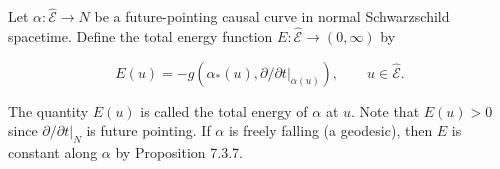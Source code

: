 Let $\alpha: \hat{\mathcal{E}} \rightarrow N$ be a future-pointing causal curve in normal Schwarzschild spacetime. Define the total energy function $E: \hat{\mathcal{E}} \rightarrow (0, \infty)$ by

$$E(u) = -g(\alpha_*(u), \partial/\partial t|_{\alpha(u)}), \qquad u \in \hat{\mathcal{E}}.$$

The quantity $E(u)$ is called the total energy of $\alpha$ at $u$. Note that $E(u) > 0$ since $\partial/\partial t|_N$ is future pointing. If $\alpha$ is freely falling (a geodesic), then $E$ is constant along $\alpha$ by Proposition 7.3.7.